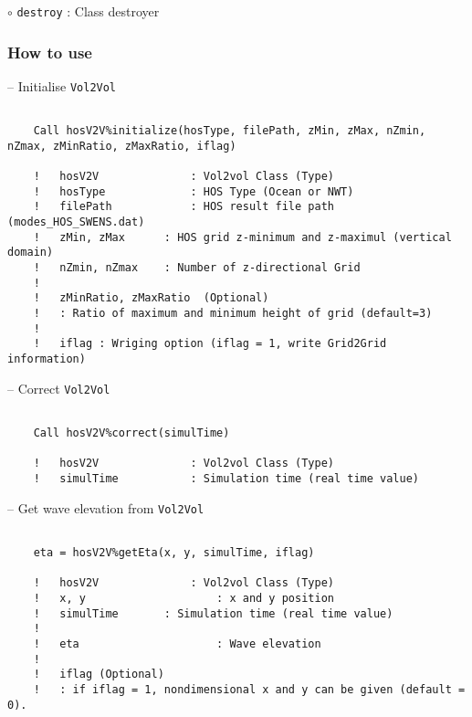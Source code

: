 	\hspace{1.0 cm} $\circ$ \texttt{destroy} : Class destroyer\\    
	
	\pagebreak
	
	\subsubsection{How to use}
	
	\hspace{0.5 cm} -- Initialise \texttt{Vol2Vol}
	
	\begin{lstlisting}[language={[95]Fortran}]
	
	Call hosV2V%initialize(hosType, filePath, zMin, zMax, nZmin, nZmax, zMinRatio, zMaxRatio, iflag)
	
	!	hosV2V				: Vol2vol Class (Type)
	!	hosType				: HOS Type (Ocean or NWT)
	!	filePath			: HOS result file path (modes_HOS_SWENS.dat)
	!	zMin, zMax 		: HOS grid z-minimum and z-maximul (vertical domain)
	!	nZmin, nZmax 	: Number of z-directional Grid	
	!
	!	zMinRatio, zMaxRatio  (Optional)
	!	: Ratio of maximum and minimum height of grid (default=3)
	!
	!	iflag : Wriging option (iflag = 1, write Grid2Grid information)
	\end{lstlisting}
	
	\hspace{0.5 cm} -- Correct \texttt{Vol2Vol}
	
	\begin{lstlisting}[language={[95]Fortran}]
	
	Call hosV2V%correct(simulTime)
	
	!	hosV2V				: Vol2vol Class (Type)
	!	simulTime			: Simulation time (real time value)
	\end{lstlisting}	
	
	\hspace{0.5 cm} -- Get wave elevation from \texttt{Vol2Vol}
	
	\begin{lstlisting}[language={[95]Fortran}]
	
	eta = hosV2V%getEta(x, y, simulTime, iflag)
	
	!	hosV2V				: Vol2vol Class (Type)
	!	x, y					: x and y position 
	!	simulTime 		: Simulation time (real time value)
	!
	!	eta						: Wave elevation
	!
	!	iflag (Optional)	
	!	: if iflag = 1, nondimensional x and y can be given (default = 0). 	
	\end{lstlisting}		
	

